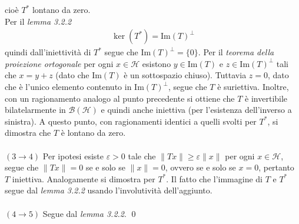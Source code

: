 \documentclass{article}
\numberwithin{equation}{subsection}
\begin{document}
cioè $T^*$ lontano da zero. \\
Per il \textit{lemma 3.2.2}
\begin{align*}
    \ker(T^*) = \mathrm{Im}(T)^\perp 
\end{align*}
quindi dall'iniettività di $T^*$ segue che $\mathrm{Im}(T)^\perp = \{0\}$. Per il \textit{teorema della proiezione ortogonale} per ogni $x \in \mathcal{H}$ esistono $y \in \mathrm{Im}(T)$ e $z \in \mathrm{Im}(T)^\perp$ tali che $x = y + z$ (dato che $\mathrm{Im}(T)$ è un sottospazio chiuso). Tuttavia $z = 0$, dato che è l'unico elemento contenuto in $\mathrm{Im}(T)^\perp$, segue che $T$ è suriettiva. Inoltre, con un ragionamento analogo al punto precedente si ottiene che $T$ è invertibile bilatelarmente in $\mathcal{B}(\mathcal{H})$ e quindi anche iniettiva (per l'esistenza dell'inverso a sinistra). A questo punto, con ragionamenti identici a quelli svolti per $T^*$, si dimostra che $T$ è lontano da zero. \\ \\
$(3 \rightarrow 4)$ Per ipotesi esiste $\varepsilon > 0$ tale che $\|Tx\| \geq \varepsilon\|x\|$ per ogni $x \in \mathcal{H}$, segue che $\|Tx\| = 0$ se e solo se $\|x\| = 0$, ovvero se e solo se $x = 0$, pertanto $T$ iniettiva. Analogamente si dimostra per $T^*$. Il fatto che l'immagine di $T$ e $T^*$ segue dal \textit{lemma 3.2.2} usando l'involutività dell'aggiunto. \\ \\
$(4 \rightarrow 5)$ Segue dal \textit{lemma 3.2.2}. \qed 

\newpage
\end{document}
